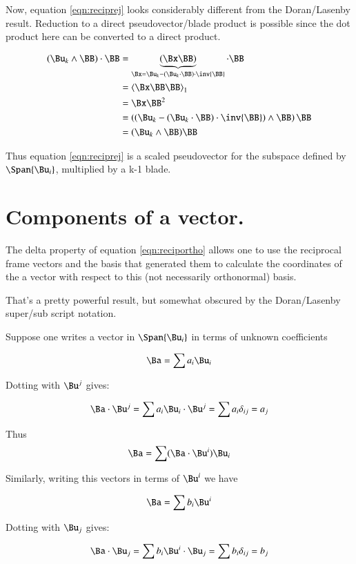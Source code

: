 \documentclass{article}      %
\newcommand{\gpgradeone}[1] {{\left\langle{{#1}}\right\rangle}_{1}}
\begin{document}
Now, 
equation \ref{eqn:reciprej}
looks considerably different from the Doran/Lasenby result.
Reduction to a direct pseudovector/blade product is possible since the
dot product here can be converted to a direct product.

\begin{align*}
(\Bu_k \wedge \BB) \cdot \BB
&= 
\underbrace{(\Bx \BB)}_{\Bx = \Bu_k - (\Bu_k \cdot \BB) \cdot \inv{\BB}}
\cdot \BB \\
&= \gpgradeone{
\Bx\BB \BB
} \\
&= \Bx \BB^2 \\
&= \left(\left(\Bu_k - (\Bu_k \cdot \BB) \cdot \inv{\BB}\right) \wedge \BB\right) \BB \\
&= (\Bu_k \wedge \BB) \BB \\
\end{align*}

Thus equation \ref{eqn:reciprej} is a scaled pseudovector for the subspace
defined by $\Span {\Bu_i}$, multiplied by a k-1 blade.

\section{ Components of a vector. }

The delta property of 
equation \ref{eqn:reciportho} allows one to use the reciprocal frame
vectors and the basis that generated them to calculate the coordinates
of the a vector with respect to this (not necessarily orthonormal) basis.

That's a pretty powerful result, but somewhat obscured by the Doran/Lasenby
super/sub script notation.

Suppose one writes a vector in $\Span{\Bu_i}$ in terms of unknown coefficients 

\[
\Ba = \sum a_i \Bu_i
\]

Dotting with $\Bu^j$ gives:

\[
\Ba \cdot \Bu^j 
= \sum a_i \Bu_i \cdot \Bu^j
= \sum a_i \delta_{ij}
= a_j
\]

Thus
\begin{equation}\label{eqn:nonrecipcomponents}
\Ba = \sum (\Ba \cdot \Bu^i) \Bu_i
\end{equation}

Similarly, writing this vectors in terms of $\Bu^i$ we have

\[
\Ba = \sum b_i \Bu^i
\]

Dotting with $\Bu_j$ gives:

\[
\Ba \cdot \Bu_j 
= \sum b_i \Bu^i \cdot \Bu_j
= \sum b_i \delta_{ij}
= b_j
\]
\end{document}
